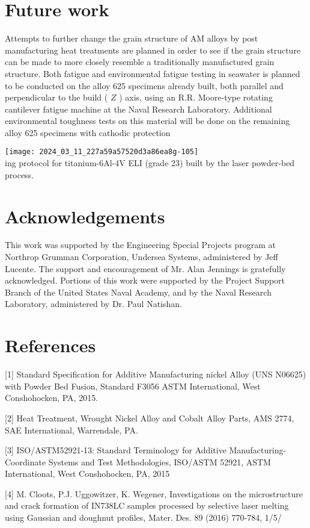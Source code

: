 \documentclass[10pt]{article}
\begin{document}
\section*{Future work}
Attempts to further change the grain structure of AM alloys by post manufacturing heat treatments are planned in order to see if the grain structure can be made to more closely resemble a traditionally manufactured grain structure. Both fatigue and environmental fatigue testing in seawater is planned to be conducted on the alloy 625 specimens already built, both parallel and perpendicular to the build ( $Z$ ) axis, using an R.R. Moore-type rotating cantilever fatigue machine at the Naval Research Laboratory. Additional environmental toughness tests on this material will be done on the remaining alloy 625 specimens with cathodic protection

\texttt{[image: 2024\_03\_11\_227a59a57520d3a86ea8g-105]}\\
ing protocol for titanium-6Al-4V ELI (grade 23) built by the laser powder-bed process.

\section*{Acknowledgements}
This work was supported by the Engineering Special Projects program at Northrop Grumman Corporation, Undersea Systems, administered by Jeff Lucente. The support and encouragement of Mr. Alan Jennings is gratefully acknowledged. Portions of this work were supported by the Project Support Branch of the United States Naval Academy, and by the Naval Research Laboratory, administered by Dr. Paul Natishan.

\section*{References}
[1] Standard Specification for Additive Manufacturing nickel Alloy (UNS N06625) with Powder Bed Fusion, Standard F3056 ASTM International, West Conshohocken, PA, 2015.

[2] Heat Treatment, Wrought Nickel Alloy and Cobalt Alloy Parts, AMS 2774, SAE International, Warrendale, PA.

[3] ISO/ASTM52921-13: Standard Terminology for Additive Manufacturing-Coordinate Systems and Test Methodologies, ISO/ASTM 52921, ASTM International, West Conshohocken, PA, 2015

[4] M. Cloots, P.J. Uggowitzer, K. Wegener, Investigations on the microstructure and crack formation of IN738LC samples processed by selective laser melting using Gaussian and doughnut profiles, Mater. Des. 89 (2016) 770-784, 1/5/
\end{document}
